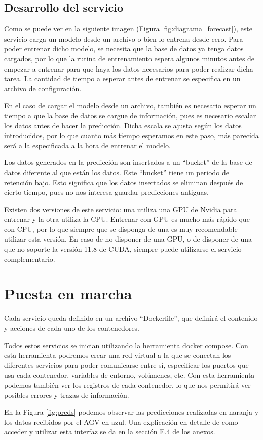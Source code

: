 \subsection{Desarrollo del servicio}

Como se puede ver en la siguiente imagen (Figura \ref{fig:diagrama_forecast}), este servicio carga un modelo desde 
un archivo o bien lo entrena desde cero. Para poder entrenar dicho modelo, se necesita que la base de datos ya tenga 
datos cargados, por lo que la rutina de entrenamiento espera algunos minutos antes de empezar a entrenar para que 
haya los datos necesarios para poder realizar dicha tarea. La cantidad de tiempo a esperar antes de entrenar se especifica 
en un archivo de configuración.

En el caso de cargar el modelo desde un archivo, también es necesario esperar un tiempo a que la base de datos se cargue 
de información, pues es necesario escalar los datos antes de hacer la predicción. Dicha escala se ajusta según los datos 
introducidos, por lo que cuanto más tiempo esperamos en este paso, más parecida será a la especificada a la hora
de entrenar el modelo.

Los datos generados en la predicción son insertados a un ``bucket'' de la base de datos diferente al que están los datos.
Este ``bucket'' tiene un periodo de retención bajo. Esto significa que los datos insertados se eliminan después 
de cierto tiempo, pues no nos interesa guardar predicciones antiguas.

Existen dos versiones de este servicio: una utiliza una GPU de Nvidia para entrenar y la otra utiliza la CPU. Entrenar con
GPU es mucho más rápido que con CPU, por lo que siempre que se disponga de una es muy recomendable utilizar esta versión.
En caso de no disponer de una GPU, o de disponer de una que no soporte la versión 11.8 de CUDA, siempre puede utilizarse el 
servicio complementario.


\section{Puesta en marcha}

Cada servicio queda definido en un archivo ``Dockerfile'', que definirá el contenido y acciones de cada uno de los 
contenedores.

Todos estos servicios se inician utilizando la herramienta docker compose. Con esta herramienta podremos crear
una red virtual a la que se conectan los diferentes servicios para poder comunicarse entre sí, especificar los
puertos que usa cada contenedor, variables de entorno, volúmenes, etc. Con esta herramienta podemos también ver los registros de cada contenedor, lo que nos permitirá ver posibles errores 
y trazas de información.


En la Figura \ref{fig:preds} podemos observar las predicciones realizadas en naranja y los datos 
recibidos por el AGV en azul. Una explicación en detalle de como acceder y utilizar esta interfaz se da 
en la sección E.4 de los anexos.